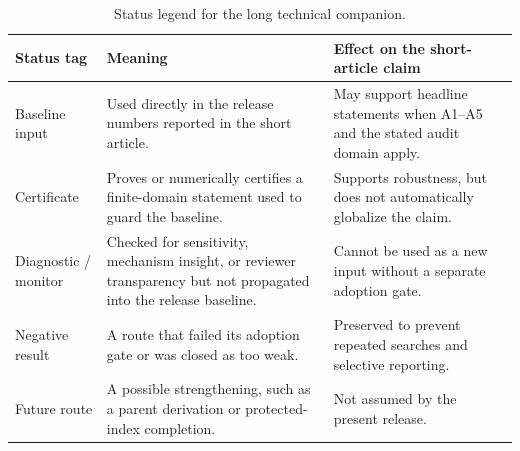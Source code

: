 \documentclass[pdflatex,sn-mathphys-num,iicol]{sn-jnl}
\begin{document}
\begin{table}[t]
\centering
\caption{Status legend for the long technical companion.}
\label{tab:supplement_status_legend}
\small
\setlength{\tabcolsep}{4pt}
\renewcommand{\arraystretch}{1.12}
\begin{tabular}{@{}l l l@{}}
\toprule
\parbox[t]{0.21\textwidth}{\raggedright \textbf{Status tag}} & \parbox[t]{0.34\textwidth}{\raggedright \textbf{Meaning}} & \parbox[t]{0.33\textwidth}{\raggedright \textbf{Effect on the short-article claim}} \\
\midrule
\parbox[t]{0.21\textwidth}{\raggedright Baseline input} &
\parbox[t]{0.34\textwidth}{\raggedright Used directly in the release numbers reported in the short article.} &
\parbox[t]{0.33\textwidth}{\raggedright May support headline statements when A1--A5 and the stated audit domain apply.} \\
\parbox[t]{0.21\textwidth}{\raggedright Certificate} &
\parbox[t]{0.34\textwidth}{\raggedright Proves or numerically certifies a finite-domain statement used to guard the baseline.} &
\parbox[t]{0.33\textwidth}{\raggedright Supports robustness, but does not automatically globalize the claim.} \\
\parbox[t]{0.21\textwidth}{\raggedright Diagnostic / monitor} &
\parbox[t]{0.34\textwidth}{\raggedright Checked for sensitivity, mechanism insight, or reviewer transparency but not propagated into the release baseline.} &
\parbox[t]{0.33\textwidth}{\raggedright Cannot be used as a new input without a separate adoption gate.} \\
\parbox[t]{0.21\textwidth}{\raggedright Negative result} &
\parbox[t]{0.34\textwidth}{\raggedright A route that failed its adoption gate or was closed as too weak.} &
\parbox[t]{0.33\textwidth}{\raggedright Preserved to prevent repeated searches and selective reporting.} \\
\parbox[t]{0.21\textwidth}{\raggedright Future route} &
\parbox[t]{0.34\textwidth}{\raggedright A possible strengthening, such as a parent derivation or protected-index completion.} &
\parbox[t]{0.33\textwidth}{\raggedright Not assumed by the present release.} \\
\bottomrule
\end{tabular}
\end{table}
\end{document}
